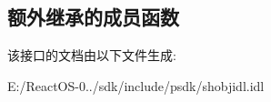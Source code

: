 \subsection*{额外继承的成员函数}


该接口的文档由以下文件生成\+:\begin{DoxyCompactItemize}
\item 
E\+:/\+React\+O\+S-\/0../sdk/include/psdk/shobjidl.\+idl\end{DoxyCompactItemize}
